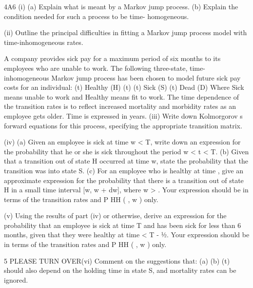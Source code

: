 \documentclass[a4paper,12pt]{article}
\begin{document}
\begin{enumerate}

 4A6
(i)
(a) Explain what is meant by a Markov jump process.
(b) Explain the condition needed for such a process to be time-
homogeneous.

(ii)
Outline the principal difficulties in fitting a Markov jump process model with
time-inhomogeneous rates.

A company provides sick pay for a maximum period of six months to its employees
who are unable to work. The following three-state, time-inhomogeneous Markov
jump process has been chosen to model future sick pay costs for an individual:
(t)
Healthy
(H)
(t)
(t)
Sick
(S)
(t)
Dead
(D)
Where Sick means unable to work and Healthy means fit to work.
The time dependence of the transition rates is to reflect increased mortality and
morbidity rates as an employee gets older. Time is expressed in years.
(iii) Write down Kolmorgorov s forward equations for this process, specifying the
appropriate transition matrix.

(iv) (a)
Given an employee is sick at time w < T, write down an expression for
the probability that he or she is sick throughout the period w < t < T.
(b)
Given that a transition out of state H occurred at time w, state the
probability that the transition was into state S.
(c)
For an employee who is healthy at time , give an approximate
expression for the probability that there is a transition out of state H in
a small time interval [w, w + dw], where w > . Your expression
should be in terms of the transition rates and P HH ( , w ) only.

(v)
Using the results of part (iv) or otherwise, derive an expression for the
probability that an employee is sick at time T and has been sick for less than 6
months, given that they were healthy at time < T - 1⁄2. Your expression
should be in terms of the transition rates and P HH ( , w ) only.


 5
PLEASE TURN OVER(vi)
Comment on the suggestions that:
(a)
(b)
(t) should also depend on the holding time in state S, and
mortality rates can be ignored.


\end{enumerate}
\end{document}
